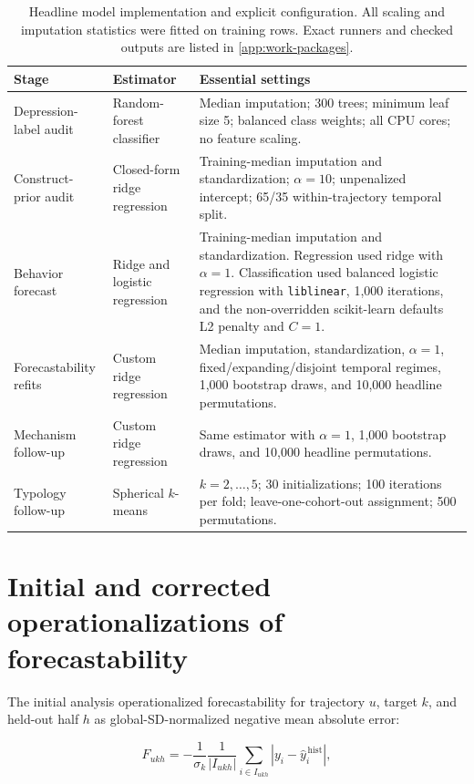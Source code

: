 \documentclass[a4paper,11pt,oneside]{report}
\begin{document}
\begin{table}[H]
\centering
\footnotesize
\caption[Headline model implementation]{Headline model implementation and explicit
configuration. All scaling and imputation statistics were fitted on training rows.
Exact runners and checked outputs are listed in \cref{app:work-packages}.}
\label{tab:model-config}
\begin{tabularx}{\textwidth}{@{}L{0.20\textwidth}L{0.22\textwidth}Y@{}}
\toprule
Stage & Estimator & Essential settings \\
\midrule
Depression-label audit & Random-forest classifier & Median imputation; 300 trees;
minimum leaf size 5; balanced class weights; all CPU cores; no feature scaling. \\
Construct-prior audit & Closed-form ridge regression & Training-median imputation
and standardization; $\alpha=10$; unpenalized intercept; 65/35 within-trajectory
temporal split. \\
Behavior forecast & Ridge and logistic regression & Training-median imputation and
standardization. Regression used ridge with $\alpha=1$. Classification used balanced
logistic regression with \texttt{liblinear}, 1,000 iterations, and the non-overridden
scikit-learn defaults L2 penalty and $C=1$. \\
Forecastability refits & Custom ridge regression & Median imputation,
standardization, $\alpha=1$, fixed/expanding/disjoint temporal regimes, 1,000
bootstrap draws, and 10,000 headline permutations. \\
Mechanism follow-up & Custom ridge regression & Same estimator with $\alpha=1$,
1,000 bootstrap draws, and 10,000 headline permutations. \\
Typology follow-up & Spherical $k$-means & $k=2,\ldots,5$; 30 initializations; 100
iterations per fold; leave-one-cohort-out assignment; 500 permutations. \\
\bottomrule
\end{tabularx}
\end{table}

\section{Initial and corrected operationalizations of forecastability}

The initial analysis operationalized forecastability for trajectory $u$, target
$k$, and held-out half $h$ as global-SD-normalized negative mean absolute error:

\begin{equation}
F_{ukh}=-\frac{1}{\sigma_k}\frac{1}{|I_{ukh}|}
\sum_{i\in I_{ukh}}\left|y_i-\widehat{y}^{\,\mathrm{hist}}_i\right|,
\label{eq:forecastability}
\end{equation}
\end{document}
